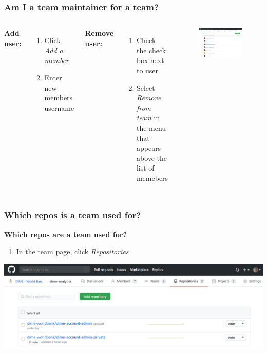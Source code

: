 \documentclass[aspectratio=169]{beamer} %
\begin{document}
\begin{frame}
	\frametitle{Am I a team maintainer for a team?}
	\begin{columns}[c]
		
		\textbf{Add user:}
		\begin{enumerate}
			\item Click \textit{Add a member}
			\item Enter new members username
		\end{enumerate}

		\textbf{Remove user:}
		\begin{enumerate}
			\item Check the check box next to user
			\item Select \textit{Remove from team} in the menu that appears above the list of memebers
		\end{enumerate}


		\begin{figure}
			\centering
			\includegraphics[width=1\linewidth]{./img/who-is-team-maintainer}
		\end{figure}
	\end{columns}
\end{frame}


\begin{frame}
	\frametitle{Which repos is a team used for?}
	\textbf{Which repos are a team used for?}
	\begin{enumerate}
		\item In the team page, click \textit{Repositories}
	\end{enumerate}
	\centering
	\includegraphics[width=.8\linewidth]{./img/which-repos-in-team}
\end{frame}
\end{document}
